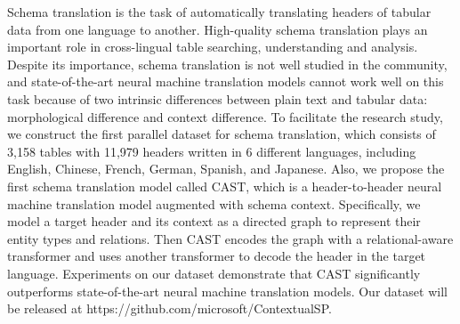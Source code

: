 Schema translation is the task of automatically translating headers of tabular data from one language to another. High-quality schema translation plays an important role in cross-lingual table searching, understanding and analysis. Despite its importance, schema translation is not well studied in the community, and state-of-the-art neural machine translation models cannot work well on this task because of two intrinsic differences between plain text and tabular data: morphological difference and context difference. To facilitate the research study, we construct the first parallel dataset for schema translation, which consists of 3,158 tables with 11,979 headers written in 6 different languages, including English, Chinese, French, German, Spanish, and Japanese. Also, we propose the first schema translation model called CAST, which is a header-to-header neural machine translation model augmented with schema context. Specifically, we model a target header and its context as a directed graph to represent their entity types and relations. Then CAST encodes the graph with a relational-aware transformer and uses another transformer to decode the header in the target language. Experiments on our dataset demonstrate that CAST significantly outperforms state-of-the-art neural machine translation models. Our dataset will be released at https://github.com/microsoft/ContextualSP.

